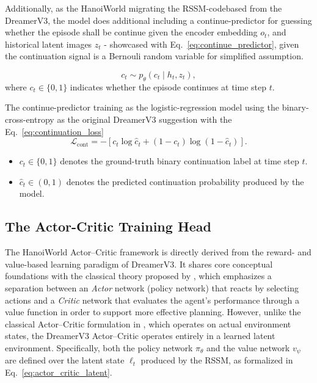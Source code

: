 Additionally, as the HanoiWorld migrating the RSSM-codebased from the DreamerV3, the model does additional including a continue-predictor for guessing whether the episode shall be continue given the encoder embedding $o_t$, and historical latent images $z_t$ \cite{Hafner2023} - showcased with Eq.~\eqref{eq:continue_predictor}, given the continuation signal is a Bernouli random variable for simplified assumption.

\begin{equation}
\label{eq:continue_predictor}
c_t \sim p_\theta(c_t \mid h_t, z_t),
\end{equation}
where $c_t \in \{0,1\}$ indicates whether the episode continues at time step $t$.

The continue-predictor training as the logistic-regression model using the binary-cross-entropy as the original DreamerV3 suggestion with the Eq.~\eqref{eq:continuation_loss}
\begin{equation}
\label{eq:continuation_loss}
\mathcal{L}_{\text{cont}}
=
-
\left[
c_t \log \hat{c}_t
+
(1 - c_t)\log(1 - \hat{c}_t)
\right].
\end{equation}

\begin{itemize}
    \item $c_t \in \{0,1\}$ denotes the ground-truth binary continuation label at time step $t$.
    \item $\hat{c}_t \in (0,1)$ denotes the predicted continuation probability produced by the model.
\end{itemize}

\subsection{The Actor-Critic Training Head}

The HanoiWorld Actor--Critic framework is directly derived from the reward- and value-based learning paradigm of DreamerV3. It shares core conceptual foundations with the classical theory proposed by \cite{sutton_1991_dyna}, which emphasizes a separation between an \emph{Actor} network (policy network) that reacts by selecting actions and a \emph{Critic} network that evaluates the agent's performance through a value function in order to support more effective planning. However, unlike the classical Actor--Critic formulation in \cite{sutton_1991_dyna}, which operates on actual environment states, the DreamerV3 Actor--Critic operates entirely in a learned latent environment. Specifically, both the policy network $\pi_\theta$ and the value network $v_\psi$ are defined over the latent state $\ell_t$ produced by the RSSM, as formalized in Eq.~\eqref{eq:actor_critic_latent}.

